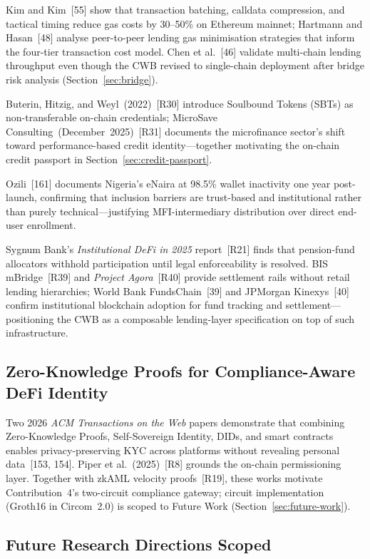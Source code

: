 \documentclass[12pt,a4paper]{report}
\begin{document}
Kim and Kim~[55] show that transaction batching, calldata compression, and tactical timing reduce gas costs by 30--50\% on Ethereum mainnet; Hartmann and Hasan~[48] analyse peer-to-peer lending gas minimisation strategies that inform the four-tier transaction cost model. Chen et al.~[46] validate multi-chain lending throughput even though the CWB revised to single-chain deployment after bridge risk analysis (Section~\ref{sec:bridge}).

Buterin, Hitzig, and Weyl~(2022)~[R30] introduce Soulbound Tokens (SBTs) as non-transferable on-chain credentials; MicroSave Consulting~(December~2025)~[R31] documents the microfinance sector's shift toward performance-based credit identity---together motivating the on-chain credit passport in Section~\ref{sec:credit-passport}.

Ozili~[161] documents Nigeria's eNaira at 98.5\% wallet inactivity one year post-launch, confirming that inclusion barriers are trust-based and institutional rather than purely technical---justifying MFI-intermediary distribution over direct end-user enrollment.

Sygnum Bank's \textit{Institutional DeFi in 2025} report~[R21] finds that pension-fund allocators withhold participation until legal enforceability is resolved. BIS mBridge~[R39] and \textit{Project Agora}~[R40] provide settlement rails without retail lending hierarchies; World Bank FundsChain~[39] and JPMorgan Kinexys~[40] confirm institutional blockchain adoption for fund tracking and settlement---positioning the CWB as a composable lending-layer specification on top of such infrastructure.

\subsection{Zero-Knowledge Proofs for Compliance-Aware DeFi Identity}
\label{sec:lit-zkp-defi}

Two 2026 \emph{ACM Transactions on the Web} papers demonstrate that combining Zero-Knowledge Proofs, Self-Sovereign Identity, DIDs, and smart contracts enables privacy-preserving KYC across platforms without revealing personal data~[153, 154]. Piper et al.~(2025)~[R8] grounds the on-chain permissioning layer. Together with zkAML velocity proofs~[R19], these works motivate Contribution~4's two-circuit compliance gateway; circuit implementation (Groth16 in Circom~2.0) is scoped to Future Work (Section~\ref{sec:future-work}).

\subsection{Future Research Directions Scoped}
\label{sec:lit-gnn}
\label{sec:lit-fl}
\label{sec:lit-retail-payments}
\label{sec:lit-llm}
\label{sec:harness-lit}
\end{document}
